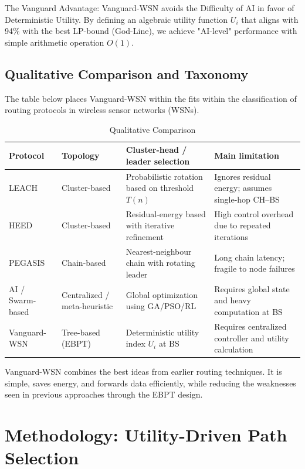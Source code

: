 \documentclass[conference]{IEEEtran}
\begin{document}
The Vanguard Advantage: Vanguard-WSN avoids the Difficulty of AI in favor of Deterministic Utility. By defining an algebraic utility function $U_i$ that aligns with 94\% with the best LP-bound (God-Line), we achieve "AI-level" performance with simple arithmetic operation $O(1)$.

\subsection{Qualitative Comparison and Taxonomy}
The table below places Vanguard-WSN within the fits within the classification of routing protocols in wireless sensor networks (WSNs).

\begin{table}[htbp]
\caption{Qualitative Comparison}
\label{tab_qual}
\centering
\small
\setlength{\tabcolsep}{6pt}
\begin{tabular}{|p{}|p{}|p{}|p{}|}
\hline
\textbf{Protocol} & \textbf{Topology} & \textbf{Cluster-head / leader selection} & \textbf{Main limitation} \\
\hline
LEACH & Cluster-based & Probabilistic rotation based on threshold $T(n)$ & Ignores residual energy; assumes single-hop CH--BS \\
HEED & Cluster-based & Residual-energy based with iterative refinement & High control overhead due to repeated iterations \\
PEGASIS & Chain-based & Nearest-neighbour chain with rotating leader & Long chain latency; fragile to node failures \\
AI / Swarm-based & Centralized / meta-heuristic & Global optimization using GA/PSO/RL & Requires global state and heavy computation at BS \\
Vanguard-WSN & Tree-based (EBPT) & Deterministic utility index $U_i$ at BS & Requires centralized controller and utility calculation \\
\hline
\end{tabular}
\end{table}

Vanguard-WSN combines the best ideas from earlier routing techniques. It is simple, saves energy, and forwards data efficiently, while reducing the weaknesses seen in previous approaches through the EBPT design.

\section{Methodology: Utility-Driven Path Selection}
\end{document}
